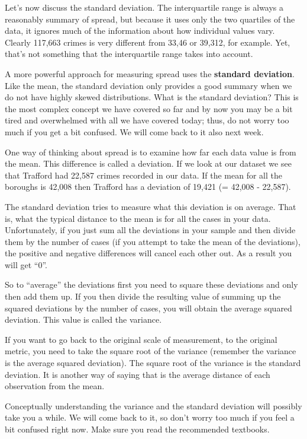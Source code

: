 \documentclass[
]{book}
\begin{document}
Let's now discuss the standard deviation. The interquartile range is always a reasonably summary of spread, but because it uses only the two quartiles of the data, it ignores much of the information about how individual values vary. Clearly 117,663 crimes is very different from 33,46 or 39,312, for example. Yet, that's not something that the interquartile range takes into account.

A more powerful approach for measuring spread uses the \textbf{standard deviation}. Like the mean, the standard deviation only provides a good summary when we do not have highly skewed distributions. What is the standard deviation? This is the most complex concept we have covered so far and by now you may be a bit tired and overwhelmed with all we have covered today; thus, do not worry too much if you get a bit confused. We will come back to it also next week.

One way of thinking about spread is to examine how far each data value is from the mean. This difference is called a deviation. If we look at our dataset we see that Trafford had 22,587 crimes recorded in our data. If the mean for all the boroughs is 42,008 then Trafford has a deviation of 19,421 (= 42,008 - 22,587).

The standard deviation tries to measure what this deviation is on average. That is, what the typical distance to the mean is for all the cases in your data.
Unfortunately, if you just sum all the deviations in your sample and then divide them by the number of cases (if you attempt to take the mean of the deviations), the positive and negative differences will cancel each other out. As a result you will get ``0''.

So to ``average'' the deviations first you need to square these deviations and only then add them up. If you then divide the resulting value of summing up the squared deviations by the number of cases, you will obtain the average squared deviation. This value is called the variance.

If you want to go back to the original scale of measurement, to the original metric, you need to take the square root of the variance (remember the variance is the average squared deviation). The square root of the variance is the standard deviation. It is another way of saying that is the average distance of each observation from the mean.

Conceptually understanding the variance and the standard deviation will possibly take you a while. We will come back to it, so don't worry too much if you feel a bit confused right now. Make sure you read the recommended textbooks.
\end{document}

